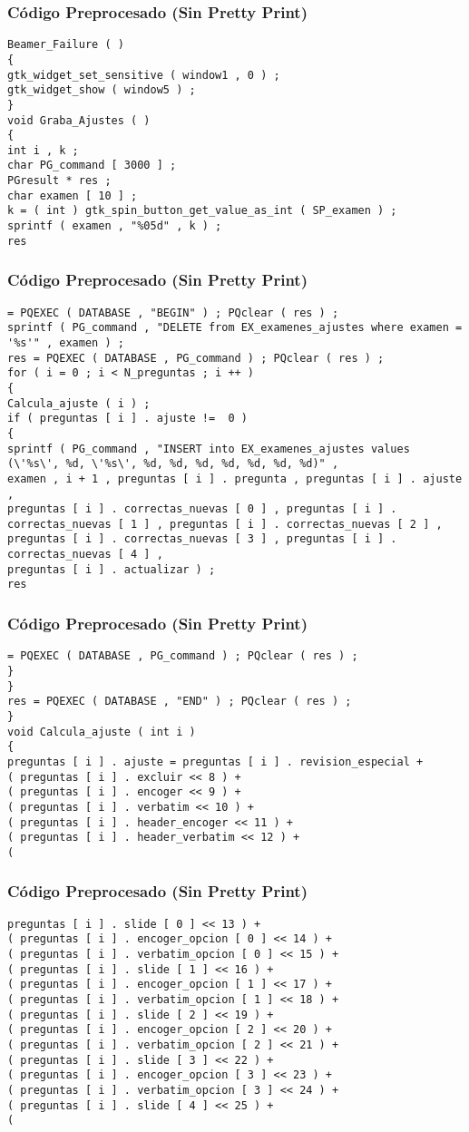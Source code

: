 \documentclass{beamer}
\begin{document}
\begin{frame}[fragile]
\frametitle{C\'odigo Preprocesado (Sin Pretty Print)}
\begin{lstlisting}[style=CStyle]
Beamer_Failure ( ) 
{ 
gtk_widget_set_sensitive ( window1 , 0 ) ; 
gtk_widget_show ( window5 ) ; 
} 
void Graba_Ajustes ( ) 
{ 
int i , k ; 
char PG_command [ 3000 ] ; 
PGresult * res ; 
char examen [ 10 ] ; 
k = ( int ) gtk_spin_button_get_value_as_int ( SP_examen ) ; 
sprintf ( examen , "%05d" , k ) ; 
res \end{lstlisting}
\end{frame}
\begin{frame}[fragile]
\frametitle{C\'odigo Preprocesado (Sin Pretty Print)}
\begin{lstlisting}[style=CStyle]
= PQEXEC ( DATABASE , "BEGIN" ) ; PQclear ( res ) ; 
sprintf ( PG_command , "DELETE from EX_examenes_ajustes where examen = '%s'" , examen ) ; 
res = PQEXEC ( DATABASE , PG_command ) ; PQclear ( res ) ; 
for ( i = 0 ; i < N_preguntas ; i ++ ) 
{ 
Calcula_ajuste ( i ) ; 
if ( preguntas [ i ] . ajuste !=  0 ) 
{ 
sprintf ( PG_command , "INSERT into EX_examenes_ajustes values (\'%s\', %d, \'%s\', %d, %d, %d, %d, %d, %d, %d)" , 
examen , i + 1 , preguntas [ i ] . pregunta , preguntas [ i ] . ajuste , 
preguntas [ i ] . correctas_nuevas [ 0 ] , preguntas [ i ] . correctas_nuevas [ 1 ] , preguntas [ i ] . correctas_nuevas [ 2 ] , 
preguntas [ i ] . correctas_nuevas [ 3 ] , preguntas [ i ] . correctas_nuevas [ 4 ] , 
preguntas [ i ] . actualizar ) ; 
res \end{lstlisting}
\end{frame}
\begin{frame}[fragile]
\frametitle{C\'odigo Preprocesado (Sin Pretty Print)}
\begin{lstlisting}[style=CStyle]
= PQEXEC ( DATABASE , PG_command ) ; PQclear ( res ) ; 
} 
} 
res = PQEXEC ( DATABASE , "END" ) ; PQclear ( res ) ; 
} 
void Calcula_ajuste ( int i ) 
{ 
preguntas [ i ] . ajuste = preguntas [ i ] . revision_especial + 
( preguntas [ i ] . excluir << 8 ) + 
( preguntas [ i ] . encoger << 9 ) + 
( preguntas [ i ] . verbatim << 10 ) + 
( preguntas [ i ] . header_encoger << 11 ) + 
( preguntas [ i ] . header_verbatim << 12 ) + 
( \end{lstlisting}
\end{frame}
\begin{frame}[fragile]
\frametitle{C\'odigo Preprocesado (Sin Pretty Print)}
\begin{lstlisting}[style=CStyle]
preguntas [ i ] . slide [ 0 ] << 13 ) + 
( preguntas [ i ] . encoger_opcion [ 0 ] << 14 ) + 
( preguntas [ i ] . verbatim_opcion [ 0 ] << 15 ) + 
( preguntas [ i ] . slide [ 1 ] << 16 ) + 
( preguntas [ i ] . encoger_opcion [ 1 ] << 17 ) + 
( preguntas [ i ] . verbatim_opcion [ 1 ] << 18 ) + 
( preguntas [ i ] . slide [ 2 ] << 19 ) + 
( preguntas [ i ] . encoger_opcion [ 2 ] << 20 ) + 
( preguntas [ i ] . verbatim_opcion [ 2 ] << 21 ) + 
( preguntas [ i ] . slide [ 3 ] << 22 ) + 
( preguntas [ i ] . encoger_opcion [ 3 ] << 23 ) + 
( preguntas [ i ] . verbatim_opcion [ 3 ] << 24 ) + 
( preguntas [ i ] . slide [ 4 ] << 25 ) + 
( \end{lstlisting}
\end{frame}
\end{document}
